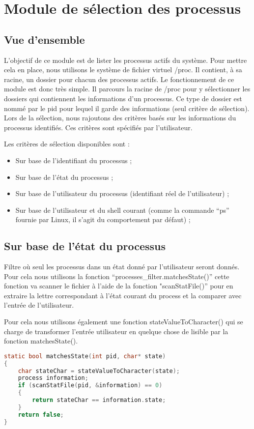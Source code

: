 \section{Module de sélection des processus}
\subsection{Vue d'ensemble}
L'objectif de ce module est de lister les processus actifs du système. Pour mettre cela en place, nous utilisons le système de fichier virtuel /proc. Il contient, à sa racine, un dossier pour chacun des processus actifs. Le fonctionnement de ce module est donc très simple. Il parcours la racine de /proc pour y sélectionner les dossiers qui contiennent les informations d'un processus. Ce type de dossier est nommé par le pid pour lequel il garde des informations (seul critère de sélection). Lors de la sélection, nous rajoutons des critères basés sur les informations du processus identifiés. Ces critères sont spécifiés par l'utilisateur.

Les critères de sélection disponibles sont :

\begin{itemize}
\item Sur base de l'identifiant du processus ;
\item Sur base de l’état du processus ;
\item Sur base de l’utilisateur du processus (identifiant réel de l'utilisateur) ;
\item Sur base de l’utilisateur et du shell courant (comme la commande “ps” 
fournie par Linux, il s'agit du comportement par défaut) ;
\end{itemize}

\subsection{Sur base de l'état du processus} 
Filtre où seul les processus dans un état donné par l’utilisateur seront donnés. Pour cela nous utilisons la fonction “processes\_filter.matchesState()” cette fonction va scanner le fichier à l’aide de la fonction "scanStatFile()” pour en extraire la lettre correspondant à l’état courant du process et la comparer avec l’entrée de l’utilisateur.

Pour cela nous utilisons également une fonction stateValueToCharacter() qui se charge de transformer l'entrée utilisateur en quelque chose de lisible par la fonction matchesState().

\begin{lstlisting}[frame=single, language=c]
static bool matchesState(int pid, char* state)
{
    char stateChar = stateValueToCharacter(state);
    process information;
    if (scanStatFile(pid, &information) == 0)
    {
        return stateChar == information.state;
    }
    return false;
}
\end{lstlisting}

